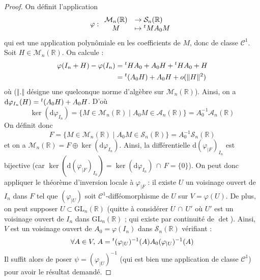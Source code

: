 	\begin{proof}
		On définit l'application
		\[ \varphi :
		\begin{array}{cl}
			\mathcal{M}_n(\mathbb{R}) &\rightarrow \mathcal{S}_n(\mathbb{R}) \\
			M &\mapsto \mathstrut ^t M A_0 M
		\end{array}
		\]
		qui est une application polynômiale en les coefficients de $M$, donc de classe $\mathcal{C}^1$. Soit $H \in \mathcal{M}_n(\mathbb{R})$. On calcule :
		\begin{align*}
			\varphi(I_n + H) - \varphi(I_n) &= \mathstrut ^t H A_0 + A_0 H + \mathstrut ^t H A_0 + H \\
			&= \mathstrut ^t (A_0 H) + A_0 H + o(\Vert H \Vert^2)
		\end{align*}
		où ($\Vert . \Vert$ désigne une quelconque norme d'algèbre sur $\mathcal{M}_n(\mathbb{R})$). Ainsi, on a $\mathrm{d} \varphi_{I_n}(H) = \mathstrut ^t (A_0 H) + A_0 H$. D'où
		\[ \ker(\mathrm{d} \varphi_{I_n}) = \{ M \in \mathcal{M}_n(\mathbb{R}) \mid A_0 M \in \mathcal{A}_n(\mathbb{R}) \} = A_0^{-1} \mathcal{A}_n(\mathbb{R}) \]
		On définit donc
		\[ F = \{ M \in \mathcal{M}_n(\mathbb{R}) \mid A_0 M \in \mathcal{S}_n(\mathbb{R}) \} = A_0^{-1} \mathcal{S}_n(\mathbb{R})  \]
		et on a $\mathcal{M}_n(\mathbb{R}) = F \oplus \ker(\mathrm{d} \varphi_{I_n})$. Ainsi, la différentielle $\mathrm{d} (\varphi_{|F})_{I_n}$ est bijective (car $\ker(\mathrm{d} (\varphi_{|F})_{I_n}) = \ker(\mathrm{d} \varphi_{I_n}) \, \cap \, F = \{ 0 \}$).
		\newpar
		On peut donc appliquer le théorème d'inversion locale à $\varphi_{|F}$ : il existe $U$ un voisinage ouvert de $I_n$ dans $F$ tel que $(\varphi_{|U})$ soit $\mathcal{C}^1$-difféomorphisme de $U$ sur $V = \varphi(U)$. De plus, on peut supposer $U \subset \mathrm{GL}_n(\mathbb{R})$ (quitte à considérer $U \, \cap \, U'$ où $U'$ est un voisinage ouvert de $I_n$ dans $\mathrm{GL}_n(\mathbb{R})$ ; qui existe par continuité de $\det$).
		\newpar
		Ainsi, $V$ est un voisinage ouvert de $A_0 = \varphi(I_n)$ dans $\mathcal{S}_n(\mathbb{R})$ vérifiant :
		\[ \forall A \in V, \, A = \mathstrut ^t (\varphi_{|U})^{-1}(A) A_0 (\varphi_{|U})^{-1}(A) \]
		Il suffit alors de poser $\psi = (\varphi_{|U})^{-1}$ (qui est bien une application de classe $\mathcal{C}^1$) pour avoir le résultat demandé.
	\end{proof}


